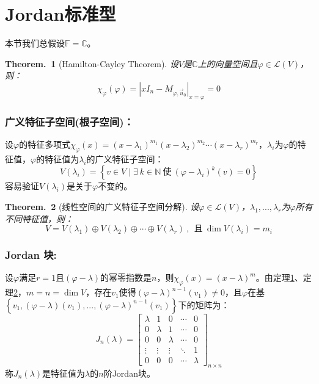 \documentclass[zihao=-4,UTF8]{report}
\theoremstyle{mystyle} %
\newtheorem{theorem}{Theorem.\,}
\begin{document}
\section{Jordan标准型}
本节我们总假设$\mathbb{F} = \mathbb{C}$。
\begin{theorem}[Hamilton-Cayley Theorem]\label{Hamilton-Cayley Theorem}
设$V$是$\mathbb{C}$上的向量空间且$\varphi \in \mathscr{L}(V)$，则：
\begin{equation*}
    \chi_{\varphi}(\varphi) =  \left | xI_n - M_{\varphi,\vec{u}_0}\right |_{x = \varphi}= 0
\end{equation*}

\end{theorem}
\subsubsection{广义特征子空间(根子空间)：}
设$\varphi$的特征多项式$ \chi_{\varphi}(x) = (x-\lambda_1)^{m_1}(x-\lambda_2)^{m_2} \cdots (x-\lambda_r)^{m_r}$，$\lambda_i$为$\varphi$的特征值，$\varphi$的特征值为$\lambda_i$的广义特征子空间：
\begin{equation*}
    V(\lambda_i) = \left\{v\in V\mid \exists\ k \in \mathbb{N}\ \text{使}\ (\varphi - \lambda_i)^k(v) = 0   \right\}
\end{equation*}
容易验证$V(\lambda_i)$是关于$\varphi$不变的。

\begin{theorem}[线性空间的广义特征子空间分解]\label{线性空间的广义特征子空间分解}
设$\varphi \in \mathscr{L}(V)$，$\lambda_1,...,\lambda_r$为$\varphi$所有不同特征值，则：
\begin{equation*}
    V = V(\lambda_1) \oplus V(\lambda_2) \oplus \cdots \oplus V(\lambda_r)\ ,\ \ \text{且}\ \dim V(\lambda_i) = m_i
\end{equation*}
\end{theorem}
\subsubsection{Jordan 块:}
设$\varphi$满足$r=1$且$(\varphi - \lambda)$的幂零指数是$n$，则$\chi_\varphi(x) = (x - \lambda)^m$。由定理\ref{Hamilton-Cayley Theorem}、定理\ref{线性空间的广义特征子空间分解}，$m = n = \dim V$，存在$v_1$使得$(\varphi-\lambda)^{n-1}(v_1) \ne 0$，且$\varphi$在基$\left\{ v_1,(\varphi-\lambda)(v_1),...,(\varphi-\lambda)^{n-1}(v_1) \right\}$下的矩阵为：
\begin{equation*}
    J_n(\lambda) = 
    \begin{bmatrix}
        \lambda&  1&  0&  \cdots&0 \\
        0&  \lambda&  1&  \cdots&0 \\
        0&  0&  \lambda&  \cdots&0 \\
        \vdots&  \vdots&  \vdots&  \ddots & 1\\
        0&  0&  0&  \cdots&\lambda
      \end{bmatrix}_{ n\times n}
\end{equation*}
称$J_n(\lambda)$是特征值为$\lambda$的$n$阶Jordan块。
\end{document}
